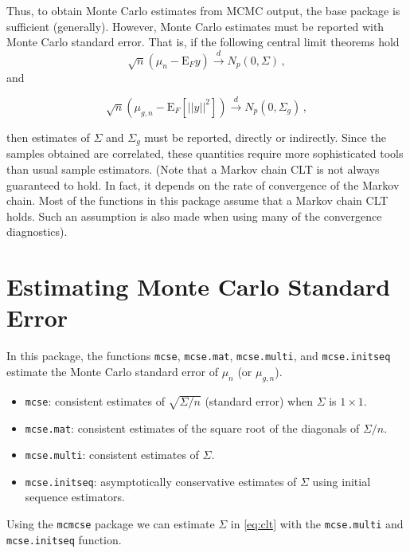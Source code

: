 \documentclass[11pt]{article}\usepackage[]{graphicx}\usepackage[]{color}
\begin{document}
Thus, to obtain Monte Carlo estimates from MCMC output, the base package is sufficient (generally). However, Monte Carlo estimates must be reported with Monte Carlo standard error. That is, if the following central limit theorems hold
\begin{equation}
\label{eq:clt}
\sqrt{n}(\mu_n - \text{E}_F y) \overset{d}{\to} N_p(0, \Sigma)\,,
\end{equation}
and

\begin{equation}
\label{eq:g_clt}
\sqrt{n}(\mu_{g,n} - \text{E}_F [||y||^2]) \overset{d}{\to} N_p(0, \Sigma_g)\,,
\end{equation}

then estimates of $\Sigma$ and $\Sigma_g$ must be reported, directly or indirectly. Since the samples obtained are correlated, these quantities require more sophisticated tools than usual sample estimators.
(Note that a Markov chain CLT is not always guaranteed to hold. In fact, it depends on the rate of convergence of the Markov chain. Most of the functions in this package assume that a Markov chain CLT holds. Such an assumption is also made when using many of the convergence diagnostics).

\bigskip

\section{Estimating Monte Carlo Standard Error}
In this package, the functions \texttt{mcse}, \texttt{mcse.mat}, \texttt{mcse.multi}, and \texttt{mcse.initseq} estimate the Monte Carlo standard error of $\mu_n$ (or $\mu_{g,n}$).
\begin{itemize}
\item \texttt{mcse}: consistent estimates of $\sqrt{\Sigma/n}$ (standard error) when $\Sigma$ is $1 \times 1$. 
\item \texttt{mcse.mat}: consistent estimates of the square root of the  diagonals of $\Sigma/n$.
\item \texttt{mcse.multi}: consistent estimates of $\Sigma$.
\item \texttt{mcse.initseq}: asymptotically conservative estimates of $\Sigma$ using initial sequence estimators.
\end{itemize}

Using the \texttt{mcmcse} package we can estimate $\Sigma$ in \eqref{eq:clt} with the \texttt{mcse.multi} and \texttt{mcse.initseq} function.
\end{document}
